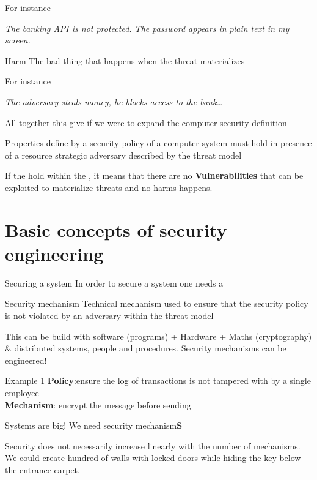For instance 
\begin{center}
    \textit{The banking API is not protected. The password appears in plain text in my screen.}
\end{center}

\begin{definition}{Harm}
The bad thing that happens when the threat materializes
\end{definition}
For instance
\begin{center}
    \textit{The adversary steals money, he blocks access to the bank\ldots}
\end{center}

All together this give if we were to expand the computer security definition 
\begin{center}
    Properties define by a security policy of a computer system must hold in presence of a resource strategic adversary described by the threat model
\end{center}
If the  hold within the , it means that there are no \textbf{Vulnerabilities} that can be exploited to materialize threats and no harms happens.

\section{Basic concepts of security engineering}

\begin{parag}{Securing a system}
    In order to secure a system one needs a 
	\begin{definition}{Security mechanism}
	Technical mechanism used to ensure that the security policy is not violated by an adversary within the threat model
	\end{definition}
	This can be build with software (programs) + Hardware + Maths (cryptography) \& distributed systems, people and procedures. Security mechanisms can be engineered!
	\begin{subparag}{Example 1}
	    \textbf{Policy}:ensure the log of transactions is not tampered with by a single employee\\
		\textbf{Mechanism}: encrypt the message before sending
	\end{subparag}
	\begin{center}
		Systems are big! We need security mechanism\textbf{S}
	\end{center}
	Security does not necessarily increase linearly with the number of mechanisms. We could create hundred of walls with locked doors while hiding the key below the entrance carpet.
\end{parag}

